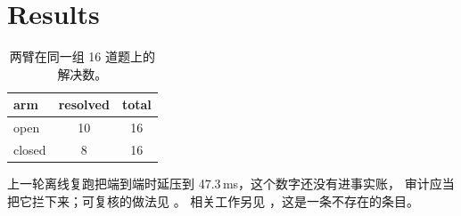 \section{Results}
\label{sec:results}

\begin{table}[t]
\centering
\begin{tabular}{lcc}
\hline
arm & resolved & total \\
\hline
open   & 10 & 16 \\
closed &  8 & 16 \\
\hline
\end{tabular}
\caption{两臂在同一组 16 道题上的解决数。}
\end{table}

上一轮离线复跑把端到端时延压到 47.3\,ms，这个数字还没有进事实账，
审计应当把它拦下来；可复核的做法见 \cite{chen2023factscore}。
相关工作另见 \cite{ghost2024}，这是一条不存在的条目。
